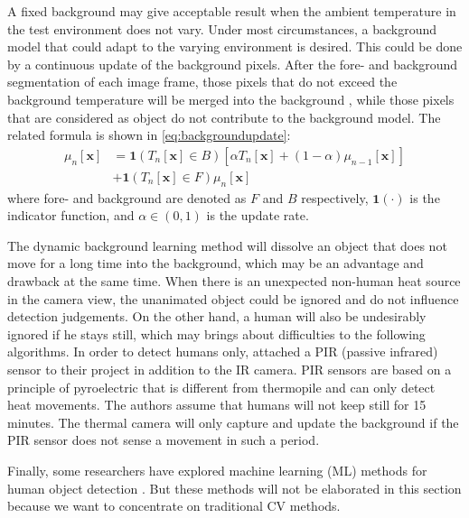 A fixed background may give acceptable result when the ambient temperature in the test environment does not vary. Under most circumstances, a background model that could adapt to the varying environment is desired. This could be done by a continuous update of the background pixels. After the fore- and background segmentation of each image frame, those pixels that do not exceed the background temperature will be merged into the background \cite{melexis,IRTAS16x4}, while those pixels that are considered as object do not contribute to the background model. The related formula is shown in \autoref{eq:backgroundupdate}:
\begin{equation} \label{eq:backgroundupdate}
\begin{split}
\mu_n[\mathbf{x}] & = \mathbf{1}\left(T_n[\mathbf{x}]\in B\right)\left[\alpha T_n[\mathbf{x}]+(1-\alpha)\mu_{n-1}[\mathbf{x}]\right]
  \\&+\mathbf{1}\left(T_n[\mathbf{x}]\in F\right) \mu_n[\mathbf{x}]
\end{split}
\end{equation}
where fore- and background are denoted as $F$ and $B$ respectively, $\mathbf{1}(\cdot)$ is the indicator function, and $\alpha \in (0,1)$ is the update rate.

The dynamic background learning method will dissolve an object that does not move for a long time into the background, which may be an advantage and drawback at the same time. When there is an unexpected non-human heat source in the camera view, the unanimated object could be ignored and do not influence detection judgements. On the other hand, a human will also be undesirably ignored if he stays still, which may brings about difficulties to the following algorithms. In order to detect humans only, \citeauthor{thermosense} \cite{thermosense} attached a PIR (passive infrared) sensor to their project in addition to the IR camera. PIR sensors are based on a principle of pyroelectric that is different from thermopile and can only detect heat movements. The authors assume that humans will not keep still for 15 minutes. The thermal camera will only capture and update the background if the PIR sensor does not sense a movement in such a period.

Finally, some researchers have explored machine learning (ML) methods for human object detection \cite{multi,karayaneva2018use}. But these methods will not be elaborated in this section because we want to concentrate on traditional CV methods.

